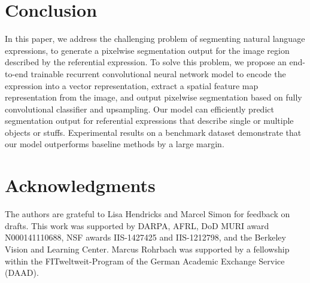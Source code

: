 \documentclass[runningheads]{llncs}
\begin{document}
\section{Conclusion}

In this paper, we address the challenging problem of segmenting natural language expressions, to generate a pixelwise segmentation output for the image region described by the referential expression. To solve this problem, we propose an end-to-end trainable recurrent convolutional neural network model to encode the expression into a vector representation, extract a spatial feature map representation from the image, and output pixelwise segmentation based on fully convolutional classifier and upsampling. Our model can efficiently predict segmentation output for referential expressions that describe single or multiple objects or stuffs. Experimental results on a benchmark dataset demonstrate that our model outperforms baseline methods by a large margin.

\section*{Acknowledgments}

The authors are grateful to Lisa Hendricks and Marcel Simon for feedback on drafts. This work was supported by DARPA, AFRL, DoD MURI award N000141110688, NSF awards IIS-1427425 and IIS-1212798, and the Berkeley Vision and Learning Center. Marcus Rohrbach was supported by a fellowship within the FITweltweit-Program of the German Academic Exchange Service (DAAD).



\end{document}
